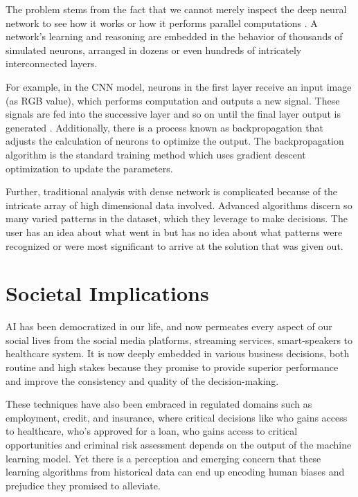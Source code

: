 The problem stems from the fact that we cannot merely inspect the deep neural network to see how it works or how it performs parallel computations \cite{darksecretaimittr}. A network’s learning and reasoning are embedded in the behavior of thousands of simulated neurons, arranged in dozens or even hundreds of intricately interconnected layers. 

For example, in the CNN model, neurons in the first layer receive an input image (as RGB value), which performs computation and outputs a new signal. These signals are fed into the successive layer and so on until the final layer output is generated \cite{darksecretaimittr}. Additionally, there is a process known as backpropagation that adjusts the calculation of neurons to optimize the output. The backpropagation algorithm is the standard training method which uses gradient descent optimization to update the parameters.

Further, traditional analysis with dense network is complicated because of the intricate array of high dimensional data involved. Advanced algorithms discern so many varied patterns in the dataset, which they leverage to make decisions. The user has an idea about what went in but has no idea about what patterns were recognized or were most significant to arrive at the solution that was given out.

\section{Societal Implications}

AI has been democratized in our life, and now permeates every aspect of our social lives from the social media platforms, streaming services, smart-speakers to healthcare system. It is now deeply embedded in various business decisions, both routine and high stakes because they promise to provide superior performance and improve the consistency and quality of the decision-making. 

These techniques have also been embraced in regulated domains such as employment, credit, and insurance, where critical decisions like who gains access to healthcare, who’s approved for a loan, who gains access to critical opportunities and criminal risk assessment \cite{ainow2018} depends on the output of the machine learning model. Yet there is a perception and emerging concern that these learning algorithms from historical data can end up encoding human biases and prejudice they promised to alleviate.

